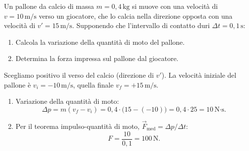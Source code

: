 
\begin{question}[ID=1.1, subtitle={Impulso di un calciatore sul pallone}, tags={quantità di moto, impulso}, difficulty=facile]
Un pallone da calcio di massa \(m = 0{,}4 \, \text{kg}\) si muove con una velocità di \(v = 10 \, \text{m/s}\) verso un giocatore, che lo calcia nella direzione opposta con una velocità di \(v' = 15 \, \text{m/s}\). Supponendo che l'intervallo di contatto duri \(\Delta t = 0{,}1 \, \text{s}\):
\begin{enumerate}
    \item Calcola la variazione della quantità di moto del pallone.
    \item Determina la forza impressa sul pallone dal giocatore.
\end{enumerate}
\begin{solution}
    Scegliamo positivo il verso del calcio (direzione di \(v'\)).
    La velocità iniziale del pallone è \(v_i = -10 \, \text{m/s}\), quella finale \(v_f = +15 \, \text{m/s}\).
    \begin{enumerate}
        \item Variazione della quantità di moto:
        \[
            \Delta p = m(v_f - v_i) = 0{,}4 \cdot \bigl(15 - (-10)\bigr) = 0{,}4 \cdot 25 = 10 \, \text{N·s}.
        \]
        \item Per il teorema impulso-quantità di moto, \(\vec{F}_{\text{med}} = \Delta p / \Delta t\):
        \[
            F = \frac{10}{0{,}1} = 100 \, \text{N}.
        \]
    \end{enumerate}
\end{solution}
\end{question}


